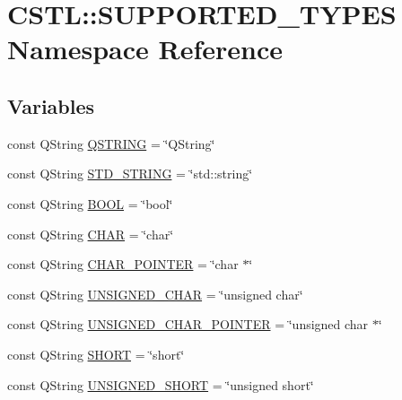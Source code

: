 \hypertarget{namespace_c_s_t_l_1_1_s_u_p_p_o_r_t_e_d___t_y_p_e_s}{}\section{C\+S\+TL\+:\+:S\+U\+P\+P\+O\+R\+T\+E\+D\+\_\+\+T\+Y\+P\+ES Namespace Reference}
\label{namespace_c_s_t_l_1_1_s_u_p_p_o_r_t_e_d___t_y_p_e_s}
\subsection*{Variables}
\begin{DoxyCompactItemize}
\item 
const Q\+String \hyperlink{namespace_c_s_t_l_1_1_s_u_p_p_o_r_t_e_d___t_y_p_e_s_a347b65aadf58d0ed4080a3a9faf44a7b}{Q\+S\+T\+R\+I\+NG} = \char`\"{}Q\+String\char`\"{}
\item 
const Q\+String \hyperlink{namespace_c_s_t_l_1_1_s_u_p_p_o_r_t_e_d___t_y_p_e_s_a9f71b18d6bc62c96518b8c748a91e51d}{S\+T\+D\+\_\+\+S\+T\+R\+I\+NG} = \char`\"{}std\+::string\char`\"{}
\item 
const Q\+String \hyperlink{namespace_c_s_t_l_1_1_s_u_p_p_o_r_t_e_d___t_y_p_e_s_aef17b5d3400db03148b665032dff3593}{B\+O\+OL} = \char`\"{}bool\char`\"{}
\item 
const Q\+String \hyperlink{namespace_c_s_t_l_1_1_s_u_p_p_o_r_t_e_d___t_y_p_e_s_a7302ec3dd5eb6a8a39b78252fe1acbf1}{C\+H\+AR} = \char`\"{}char\char`\"{}
\item 
const Q\+String \hyperlink{namespace_c_s_t_l_1_1_s_u_p_p_o_r_t_e_d___t_y_p_e_s_a50fba80a9cafc979b9624371f4aa38d2}{C\+H\+A\+R\+\_\+\+P\+O\+I\+N\+T\+ER} = \char`\"{}char $\ast$\char`\"{}
\item 
const Q\+String \hyperlink{namespace_c_s_t_l_1_1_s_u_p_p_o_r_t_e_d___t_y_p_e_s_af52d529484c69e834145d3ec5dcfe9b1}{U\+N\+S\+I\+G\+N\+E\+D\+\_\+\+C\+H\+AR} = \char`\"{}unsigned char\char`\"{}
\item 
const Q\+String \hyperlink{namespace_c_s_t_l_1_1_s_u_p_p_o_r_t_e_d___t_y_p_e_s_ab875e2d040181353b0b935b9a2388d74}{U\+N\+S\+I\+G\+N\+E\+D\+\_\+\+C\+H\+A\+R\+\_\+\+P\+O\+I\+N\+T\+ER} = \char`\"{}unsigned char $\ast$\char`\"{}
\item 
const Q\+String \hyperlink{namespace_c_s_t_l_1_1_s_u_p_p_o_r_t_e_d___t_y_p_e_s_a713f16227c25efb2836beb0040e6486b}{S\+H\+O\+RT} = \char`\"{}short\char`\"{}
\item 
const Q\+String \hyperlink{namespace_c_s_t_l_1_1_s_u_p_p_o_r_t_e_d___t_y_p_e_s_a29ab52504ead82f5dfb4410a7de06033}{U\+N\+S\+I\+G\+N\+E\+D\+\_\+\+S\+H\+O\+RT} = \char`\"{}unsigned short\char`\"{}

\end{DoxyCompactItemize}
